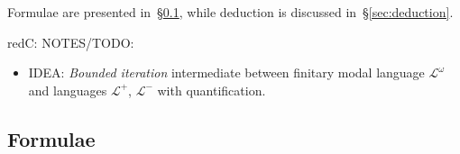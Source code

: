 \documentclass[%
  a4paper,
  UKenglish,
  cleveref,
  autoref,
  thm-restate,
  numberwithinsect,
]{lipics-v2021}
\newcommand\Lang{\mathcal{L}}
\newenvironment{colinpar}{\begin{color}{red}\sffamily C:}{\end{color}}
\begin{document}
Formulae are presented in~\S\ref{sec:formulae},
while deduction is discussed in~\S\ref{sec:deduction}.



\begin{colinpar}
NOTES/TODO:
\begin{itemize}
\item IDEA: \emph{Bounded iteration}
intermediate between finitary modal language $\Lang^\omega$
and languages $\Lang^+$, $\Lang^-$
with quantification.
\end{itemize}
\end{colinpar}



\subsection{Formulae}
\label{sec:formulae}
\end{document}
